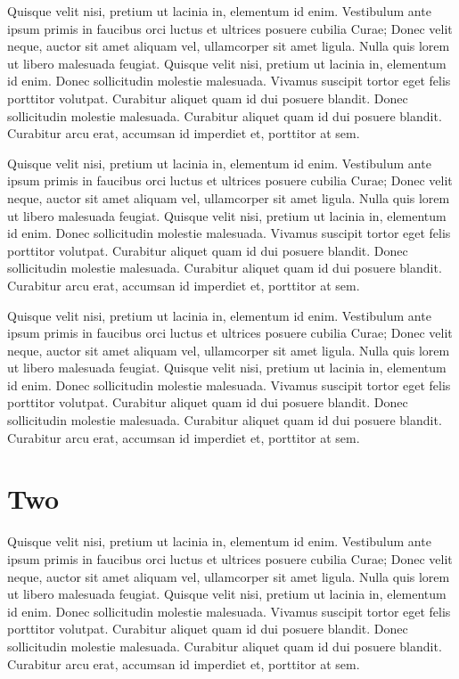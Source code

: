 \documentclass{scrbook}
\begin{document}
Quisque velit nisi, pretium ut lacinia in, elementum id enim. Vestibulum
ante ipsum primis in faucibus orci luctus et ultrices posuere cubilia
Curae; Donec velit neque, auctor sit amet aliquam vel, ullamcorper sit
amet ligula. Nulla quis lorem ut libero malesuada feugiat. Quisque velit
nisi, pretium ut lacinia in, elementum id enim. Donec sollicitudin
molestie malesuada. Vivamus suscipit tortor eget felis porttitor
volutpat. Curabitur aliquet quam id dui posuere blandit. Donec
sollicitudin molestie malesuada. Curabitur aliquet quam id dui posuere
blandit. Curabitur arcu erat, accumsan id imperdiet et, porttitor at
sem.

Quisque velit nisi, pretium ut lacinia in, elementum id enim. Vestibulum
ante ipsum primis in faucibus orci luctus et ultrices posuere cubilia
Curae; Donec velit neque, auctor sit amet aliquam vel, ullamcorper sit
amet ligula. Nulla quis lorem ut libero malesuada feugiat. Quisque velit
nisi, pretium ut lacinia in, elementum id enim. Donec sollicitudin
molestie malesuada. Vivamus suscipit tortor eget felis porttitor
volutpat. Curabitur aliquet quam id dui posuere blandit. Donec
sollicitudin molestie malesuada. Curabitur aliquet quam id dui posuere
blandit. Curabitur arcu erat, accumsan id imperdiet et, porttitor at
sem.

Quisque velit nisi, pretium ut lacinia in, elementum id enim. Vestibulum
ante ipsum primis in faucibus orci luctus et ultrices posuere cubilia
Curae; Donec velit neque, auctor sit amet aliquam vel, ullamcorper sit
amet ligula. Nulla quis lorem ut libero malesuada feugiat. Quisque velit
nisi, pretium ut lacinia in, elementum id enim. Donec sollicitudin
molestie malesuada. Vivamus suscipit tortor eget felis porttitor
volutpat. Curabitur aliquet quam id dui posuere blandit. Donec
sollicitudin molestie malesuada. Curabitur aliquet quam id dui posuere
blandit. Curabitur arcu erat, accumsan id imperdiet et, porttitor at
sem.

\hypertarget{c2-c2-two}{%
\section{Two}\label{c2-c2-two}}

Quisque velit nisi, pretium ut lacinia in, elementum id enim. Vestibulum
ante ipsum primis in faucibus orci luctus et ultrices posuere cubilia
Curae; Donec velit neque, auctor sit amet aliquam vel, ullamcorper sit
amet ligula. Nulla quis lorem ut libero malesuada feugiat. Quisque velit
nisi, pretium ut lacinia in, elementum id enim. Donec sollicitudin
molestie malesuada. Vivamus suscipit tortor eget felis porttitor
volutpat. Curabitur aliquet quam id dui posuere blandit. Donec
sollicitudin molestie malesuada. Curabitur aliquet quam id dui posuere
blandit. Curabitur arcu erat, accumsan id imperdiet et, porttitor at
sem.
\end{document}
